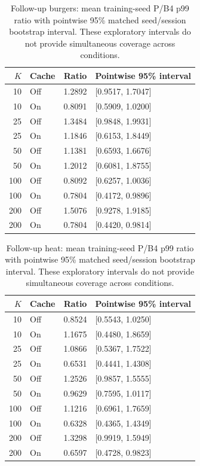 \begin{table}[ht]
\centering\small
\caption{Follow-up burgers: mean training-seed P/B4 p99 ratio with pointwise 95\% matched seed/session bootstrap interval. These exploratory intervals do not provide simultaneous coverage across conditions.}\label{tab:e2_ratio_burgers}
\begin{tabular}{@{}rlrl@{}}\toprule
$K$ & Cache & Ratio & Pointwise 95\% interval\\\midrule
10 & Off & 1.2892 & [0.9517, 1.7047]\\
10 & On & 0.8091 & [0.5909, 1.0200]\\
25 & Off & 1.3484 & [0.9848, 1.9931]\\
25 & On & 1.1846 & [0.6153, 1.8449]\\
50 & Off & 1.1381 & [0.6593, 1.6676]\\
50 & On & 1.2012 & [0.6081, 1.8755]\\
100 & Off & 0.8092 & [0.6257, 1.0036]\\
100 & On & 0.7804 & [0.4172, 0.9896]\\
200 & Off & 1.5076 & [0.9278, 1.9185]\\
200 & On & 0.7804 & [0.4420, 0.9814]\\
\bottomrule\end{tabular}
\end{table}

\begin{table}[ht]
\centering\small
\caption{Follow-up heat: mean training-seed P/B4 p99 ratio with pointwise 95\% matched seed/session bootstrap interval. These exploratory intervals do not provide simultaneous coverage across conditions.}\label{tab:e2_ratio_heat}
\begin{tabular}{@{}rlrl@{}}\toprule
$K$ & Cache & Ratio & Pointwise 95\% interval\\\midrule
10 & Off & 0.8524 & [0.5543, 1.0250]\\
10 & On & 1.1675 & [0.4480, 1.8659]\\
25 & Off & 1.0866 & [0.5367, 1.7522]\\
25 & On & 0.6531 & [0.4441, 1.4308]\\
50 & Off & 1.2526 & [0.9857, 1.5555]\\
50 & On & 0.9629 & [0.7595, 1.0117]\\
100 & Off & 1.1216 & [0.6961, 1.7659]\\
100 & On & 0.6328 & [0.4365, 1.4349]\\
200 & Off & 1.3298 & [0.9919, 1.5949]\\
200 & On & 0.6597 & [0.4728, 0.9823]\\
\bottomrule\end{tabular}
\end{table}
